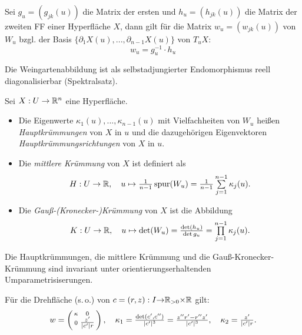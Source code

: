 \documentclass{cheat-sheet}
\begin{document}

\begin{satz}
  Sei $g_u = (g_{jk}(u))$ die Matrix der ersten und $h_u = (h_{jk}(u))$ die Matrix der zweiten FF einer Hyperfläche $X$, dann gilt für die Matrix $w_u = (w_{jk}(u))$ von $W_u$ bzgl. der Basis $\{ \partial_1 X(u), ..., \partial_{n-1} X(u) \}$ von $T_u X$:
  \[ w_u = g_u^{-1} \cdot h_u \]
\end{satz}

\begin{bem}
  Die Weingartenabbildung ist als selbstadjungierter Endomorphismus reell diagonalisierbar (Spektralsatz).
\end{bem}

\begin{defn}
  Sei $X : U \to \mathbb{R}^n$ eine Hyperfläche.
  \begin{itemize}
    \item Die Eigenwerte $\kappa_1(u), ..., \kappa_{n-1}(u)$ mit Vielfachheiten von $W_u$ heißen \emph{Hauptkrümmungen} von $X$ in $u$ und die dazugehörigen Eigenvektoren \emph{Hauptkrümmungsrichtungen} von $X$ in $u$.
    \item Die \emph{mittlere Krümmung} von $X$ ist definiert als
    \[ H : U \to \R, \quad u \mapsto \tfrac{1}{n-1} \, \spur(W_u) = \tfrac{1}{n-1} \sum_{j=1}^{n-1} \kappa_j(u). \]
    \item Die \emph{Gauß-(Kronecker-)Krümmung} von $X$ ist die Abbildung
    \[ K : U \to \R, \quad u \mapsto \det(W_u) = \tfrac{\det(h_u)}{\det{g_u}} = \prod_{j=1}^{n-1} \kappa_j(u). \]
  \end{itemize}
\end{defn}

\begin{satz}
  Die Hauptkrümmungen, die mittlere Krümmung und die Gauß-Kronecker-Krümmung sind invariant unter orientierungserhaltenden Umparametrisiserungen.
\end{satz}

\begin{bsp}
  Für die Drehfläche (s.\,o.) von $c = (r, z) : I {\to} \mathbb{R}_{>0} {\times} \mathbb{R}$ gilt:
  \[
    w = \left( \begin{smallmatrix} \kappa & 0 \\ 0 & \tfrac{z'}{\lvert c'\rvert r} \end{smallmatrix} \right), \quad
    \kappa_1 = \tfrac{\det(c', c'')}{\lvert c'\rvert^3} = \tfrac{z'' r' - r'' z'}{\lvert c'\rvert^3}, \quad
    \kappa_2 = \tfrac{z'}{\lvert c'\rvert r}.
  \]
\end{bsp}
\end{document}
